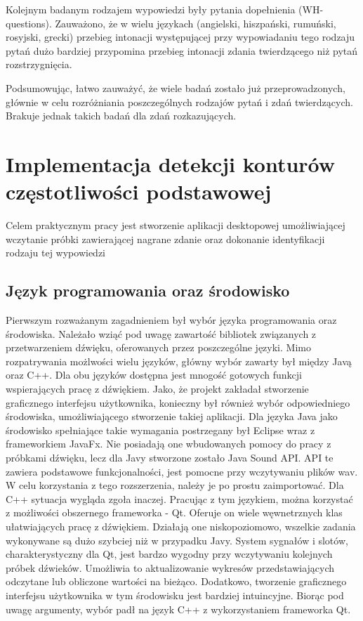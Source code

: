\documentclass[a4paper,12 pt]{article}
\begin{document}
\leavevmode
\newline
Kolejnym badanym rodzajem wypowiedzi były pytania dopełnienia (WH-questions). Zauważono, że w wielu językach (angielski, hiszpański, rumuński, rosyjski, grecki) przebieg intonacji występującej przy wypowiadaniu tego rodzaju pytań dużo bardziej przypomina przebieg intonacji zdania twierdzącego niż pytań rozstrzygnięcia.



Podsumowując, łatwo zauważyć, że wiele badań zostało już przeprowadzonych, głównie w celu rozróżniania poszczególnych rodzajów pytań i zdań twierdzących. Brakuje jednak takich badań dla zdań rozkazujących.

\section{Implementacja detekcji konturów częstotliwości podstawowej}
Celem praktycznym pracy jest stworzenie aplikacji desktopowej umożliwiającej wczytanie próbki zawierającej nagrane zdanie oraz dokonanie identyfikacji rodzaju tej wypowiedzi

\subsection{Język programowania oraz środowisko}
Pierwszym rozważanym zagadnieniem był wybór języka programowania oraz środowiska. Należało wziąć pod uwagę zawartość bibliotek związanych z przetwarzeniem dźwięku, oferowanych przez poszczególne języki.
Mimo rozpatrywania możlwości wielu języków, główny wybór zawarty był między Javą oraz C++. Dla obu języków dostępna jest mnogość gotowych funkcji wspierających pracę z dźwiękiem. Jako, że projekt zakładał stworzenie graficznego interfejsu użytkownika, 
konieczny był również wybór odpowiedniego środowiska, umożliwiającego stworzenie takiej aplikacji. Dla języka Java jako środowisko spełniające takie wymagania postrzegany był Eclipse wraz z frameworkiem JavaFx. Nie posiadają one wbudowanych pomocy do pracy z próbkami dźwięku, lecz dla Javy stworzone zostało
Java Sound API. API te zawiera podstawowe funkcjonalności, jest pomocne przy wczytywaniu plików wav. W celu korzystania z tego rozszerzenia, należy je po prostu zaimportować. Dla  C++ sytuacja wygląda zgoła inaczej. Pracując z tym językiem, można korzystać z możliwości obszernego frameworka - Qt. Oferuje on wiele węwnetrznych klas ułatwiających pracę z dźwiękiem. Działają one niskopoziomowo, wszelkie zadania wykonywane są dużo szybciej niż w przypadku Javy.  System sygnałów i slotów, charakterystyczny dla Qt, jest bardzo wygodny przy wczytywaniu kolejnych próbek dźwieków. Umożliwia to aktualizowanie wykresów przedstawiających odczytane lub obliczone wartości na bieżąco. Dodatkowo, tworzenie graficznego interfejsu użytkownika w tym środowisku jest bardziej intuincyjne. Biorąc pod uwagę argumenty, wybór padł na język C++ z wykorzystaniem frameworka Qt.
\end{document}
